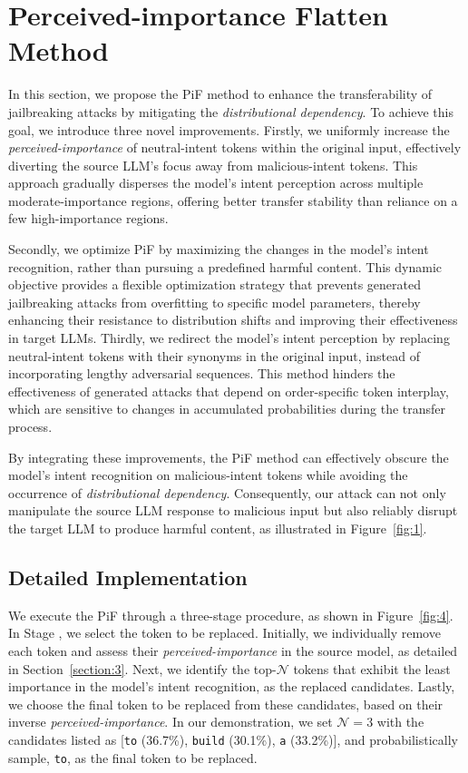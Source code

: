 \section{Perceived-importance Flatten Method}
\label{section:4}

In this section, we propose the PiF method to enhance the transferability of jailbreaking attacks by mitigating the \emph{distributional dependency}.
To achieve this goal, we introduce three novel improvements.
Firstly, we uniformly increase the \emph{perceived-importance} of neutral-intent tokens within the original input, effectively diverting the source LLM's focus away from malicious-intent tokens.
This approach gradually disperses the model's intent perception across multiple moderate-importance regions, offering better transfer stability than reliance on a few high-importance regions.

Secondly, we optimize PiF by maximizing the changes in the model's intent recognition, rather than pursuing a predefined harmful content.
This dynamic objective provides a flexible optimization strategy that prevents generated jailbreaking attacks from overfitting to specific model parameters, thereby enhancing their resistance to distribution shifts and improving their effectiveness in target LLMs.
Thirdly, we redirect the model's intent perception by replacing neutral-intent tokens with their synonyms in the original input, instead of incorporating lengthy adversarial sequences.
This method hinders the effectiveness of generated attacks that depend on order-specific token interplay, which are sensitive to changes in accumulated probabilities during the transfer process.

By integrating these improvements, the PiF method can effectively obscure the model's intent recognition on malicious-intent tokens while avoiding the occurrence of \emph{distributional dependency}. 
Consequently, our attack can not only manipulate the source LLM response to malicious input but also reliably disrupt the target LLM to produce harmful content, as illustrated in Figure~\ref{fig:1}.

\subsection{Detailed Implementation}
\label{section:4_1}

We execute the PiF through a three-stage procedure, as shown in Figure~\ref{fig:4}.
In Stage \uppercase\expandafter{}, we select the token to be replaced.
Initially, we individually remove each token and assess their \emph{perceived-importance} in the source model, as detailed in Section~\ref{section:3}.
Next, we identify the top-$\mathcal{N}$ tokens that exhibit the least importance in the model's intent recognition, as the replaced candidates.
Lastly, we choose the final token to be replaced from these candidates, based on their inverse \emph{perceived-importance}.
In our demonstration, we set $\mathcal{N} = 3$ with the candidates listed as {[\texttt{to} (36.7\%), \texttt{build} (30.1\%), \texttt{a} (33.2\%)]}, and probabilistically sample, \texttt{to}, as the final token to be replaced.

